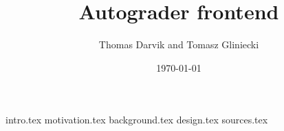 \documentclass[12pt,a4paper]{report}
\title{Autograder frontend}
\author{Thomas Darvik and Tomasz Gliniecki}
\date{\today}
\begin{document}
\maketitle
{}
\tableofcontents
{}
{intro.tex}
{motivation.tex}
{background.tex}
{design.tex}
{sources.tex}
\end{document}
